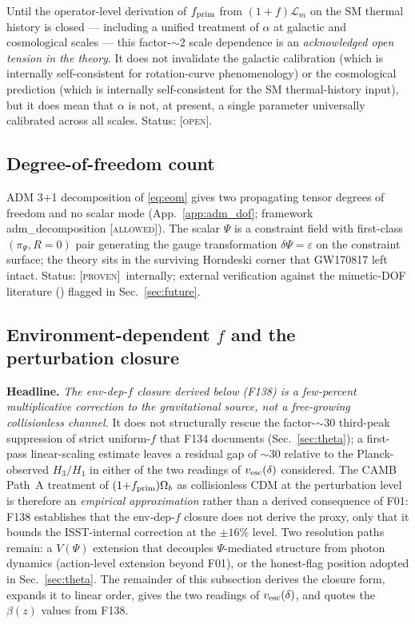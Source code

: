 \documentclass[aps,prd,twocolumn,nofootinbib,floatfix,superscriptaddress]{revtex4-2}
\newcommand{\PROVEN}{{\color{black!75!green}\textsc{[proven]}}}
\newcommand{\OPEN}{{\color{black!60!red}\textsc{[open]}}}
\newcommand{\Lm}{\mathcal{L}_m}
\newcommand{\fprim}{f_{\rm prim}}
\begin{document}
Until the operator-level derivation of $\fprim$ from $(1{+}f)\Lm$
on the SM thermal history is closed --- including a unified
treatment of $\alpha$ at galactic and cosmological scales --- this
factor-$\sim 2$ scale dependence is an \emph{acknowledged open
tension in the theory}. It does not invalidate the galactic
calibration (which is internally self-consistent for rotation-curve
phenomenology) or the cosmological prediction (which is internally
self-consistent for the SM thermal-history input), but it does
mean that $\alpha$ is not, at present, a single parameter
universally calibrated across all scales. Status: \OPEN.

\subsection{Degree-of-freedom count}

ADM 3+1 decomposition of \eqref{eq:eom} gives two propagating tensor
degrees of freedom and no scalar mode (App.~\ref{app:adm_dof};
framework \textsf{adm\_decomposition} \textsc{[allowed]}). The
scalar $\Psi$ is a constraint field with first-class
$(\pi_\Psi, R=0)$ pair generating the gauge transformation
$\delta\Psi = \varepsilon$ on the constraint surface; the theory
sits in the surviving Horndeski corner that GW170817 left intact.
Status: \PROVEN\ internally; external verification against the
mimetic-DOF literature
(\cite{Barvinsky2014,Capela2015,Firouzjahi2017,Gorji2018}) flagged
in Sec.~\ref{sec:future}.

\subsection{Environment-dependent $f$ and the perturbation closure}
\label{sec:env_dep_f_closure}

\textbf{Headline.} \emph{The env-dep-$f$ closure derived below
(F138) is a few-percent multiplicative correction to the
gravitational source, not a free-growing collisionless channel.}
It does not structurally rescue the factor-$\sim\!30$ third-peak
suppression of strict uniform-$f$ that F134 documents
(Sec.~\ref{sec:theta}); a first-pass linear-scaling estimate
leaves a residual gap of $\sim\!30$ relative to the Planck-observed
$H_3/H_1$ in either of the two readings of $v_{\rm esc}(\delta)$
considered. The CAMB Path~A treatment of $(1{+}\fprim)\Omega_b$
as collisionless CDM at the perturbation level is therefore an
\emph{empirical approximation} rather than a derived consequence of
F01: F138 establishes that the env-dep-$f$ closure does not derive
the proxy, only that it bounds the ISST-internal correction at the
$\pm 16\%$ level. Two resolution paths remain: a $V(\Psi)$
extension that decouples $\Psi$-mediated structure from photon
dynamics (action-level extension beyond F01), or the honest-flag
position adopted in Sec.~\ref{sec:theta}. The remainder of this
subsection derives the closure form, expands it to linear order,
gives the two readings of $v_{\rm esc}(\delta)$, and quotes the
$\beta(z)$ values from F138.
\end{document}
